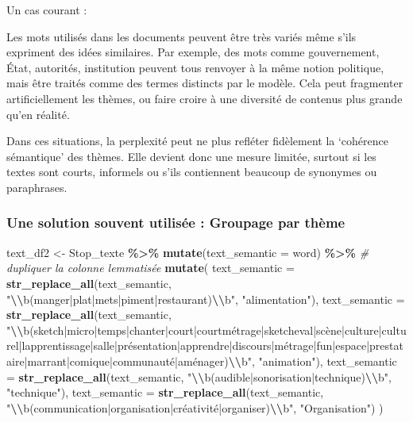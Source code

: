 \documentclass[
]{article}
\newenvironment{Shaded}{\begin{snugshade}}{\end{snugshade}}
\newcommand{\AttributeTok}[1]{\textcolor[rgb]{0.13,0.29,0.53}{#1}}
\newcommand{\CommentTok}[1]{\textcolor[rgb]{0.56,0.35,0.01}{\textit{#1}}}
\newcommand{\FunctionTok}[1]{\textcolor[rgb]{0.13,0.29,0.53}{\textbf{#1}}}
\newcommand{\NormalTok}[1]{#1}
\newcommand{\OtherTok}[1]{\textcolor[rgb]{0.56,0.35,0.01}{#1}}
\newcommand{\SpecialCharTok}[1]{\textcolor[rgb]{0.81,0.36,0.00}{\textbf{#1}}}
\newcommand{\StringTok}[1]{\textcolor[rgb]{0.31,0.60,0.02}{#1}}
\begin{document}
Un cas courant :

Les mots utilisés dans les documents peuvent être très variés même s'ils
expriment des idées similaires. Par exemple, des mots comme
gouvernement, État, autorités, institution peuvent tous renvoyer à la
même notion politique, mais être traités comme des termes distincts par
le modèle. Cela peut fragmenter artificiellement les thèmes, ou faire
croire à une diversité de contenus plus grande qu'en réalité.

Dans ces situations, la perplexité peut ne plus refléter fidèlement la
`cohérence sémantique' des thèmes. Elle devient donc une mesure limitée,
surtout si les textes sont courts, informels ou s'ils contiennent
beaucoup de synonymes ou paraphrases.

\subsubsection{Une solution souvent utilisée : Groupage par
thème}\label{une-solution-souvent-utilisuxe9e-groupage-par-thuxe8me}

\begin{Shaded}
\begin{Highlighting}[]
\NormalTok{text\_df2 }\OtherTok{\textless{}{-}}\NormalTok{ Stop\_texte }\SpecialCharTok{\%\textgreater{}\%}
  \FunctionTok{mutate}\NormalTok{(}\AttributeTok{text\_semantic =}\NormalTok{ word) }\SpecialCharTok{\%\textgreater{}\%}  \CommentTok{\# dupliquer la colonne lemmatisée}
  \FunctionTok{mutate}\NormalTok{(}
    \AttributeTok{text\_semantic =} \FunctionTok{str\_replace\_all}\NormalTok{(text\_semantic, }\StringTok{"}\SpecialCharTok{\textbackslash{}\textbackslash{}}\StringTok{b(manger|plat|mets|piment|restaurant)}\SpecialCharTok{\textbackslash{}\textbackslash{}}\StringTok{b"}\NormalTok{, }\StringTok{"alimentation"}\NormalTok{),}
    \AttributeTok{text\_semantic =} \FunctionTok{str\_replace\_all}\NormalTok{(text\_semantic, }\StringTok{"}\SpecialCharTok{\textbackslash{}\textbackslash{}}\StringTok{b(sketch|micro|temps|chanter|court|courtmétrage|sketcheval|scène|culture|culturel|lapprentissage|salle|présentation|apprendre|discours|métrage|fun|espace|prestataire|marrant|comique|communauté|aménager)}\SpecialCharTok{\textbackslash{}\textbackslash{}}\StringTok{b"}\NormalTok{, }\StringTok{"animation"}\NormalTok{),}
    \AttributeTok{text\_semantic =} \FunctionTok{str\_replace\_all}\NormalTok{(text\_semantic, }\StringTok{"}\SpecialCharTok{\textbackslash{}\textbackslash{}}\StringTok{b(audible|sonorisation|technique)}\SpecialCharTok{\textbackslash{}\textbackslash{}}\StringTok{b"}\NormalTok{, }\StringTok{"technique"}\NormalTok{),}
    \AttributeTok{text\_semantic =} \FunctionTok{str\_replace\_all}\NormalTok{(text\_semantic, }\StringTok{"}\SpecialCharTok{\textbackslash{}\textbackslash{}}\StringTok{b(communication|organisation|créativité|organiser)}\SpecialCharTok{\textbackslash{}\textbackslash{}}\StringTok{b"}\NormalTok{, }\StringTok{"Organisation"}\NormalTok{)}
\NormalTok{  )}
\end{Highlighting}
\end{Shaded}
\end{document}
